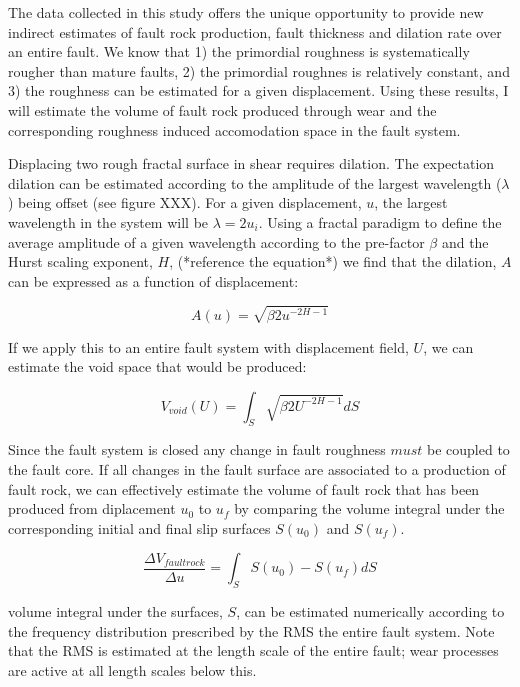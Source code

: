 \documentclass[12pt,a4paper]{article}
\begin{document}
\begin{itemize}
The data collected in this study offers the unique opportunity to provide new indirect estimates of fault rock production, fault thickness and dilation rate over an entire fault. We know that 1) the primordial roughness is systematically rougher than mature faults, 2) the primordial roughnes is relatively constant, and 3) the roughness can be estimated for a given displacement. Using these results, I will estimate the volume of fault rock produced through wear and the corresponding roughness induced accomodation space in the fault system.

Displacing two rough fractal surface in shear requires dilation. The expectation dilation can be estimated according to the amplitude of the largest wavelength ($\lambda$) being offset (see figure XXX). For a given displacement, $u$, the largest wavelength in the system will be $\lambda = 2u_i$. Using a fractal paradigm to define the average amplitude of a given wavelength according to the pre-factor $\beta$ and the Hurst scaling exponent, $H$, (*reference the equation*) we find that the dilation, $A$ can be expressed as a function of displacement:

\begin{equation}
	A(u) = \sqrt{\beta 2u^{-2H-1}}
\end{equation}

If we apply this to an entire fault system with displacement field, $U$, we can estimate the void space that would be produced:

\begin{equation}
	V_{void}(U) = \int_S \sqrt{\beta 2U^{-2H-1}}dS
\end{equation}

Since the fault system is closed any change in fault roughness $must$ be coupled to the fault core. If all changes in the fault surface are associated to a production of fault rock, we can effectively estimate the volume of fault rock that has been produced from diplacement $u_0$ to $u_f$ by comparing the volume integral under the corresponding initial and final slip surfaces $S(u_0)$ and $S(u_f)$.

\begin{equation}
	\dfrac {\Delta V_{fault rock}}{\Delta u} = \int_S S(u_0) - S(u_f) dS
\end{equation}

volume integral under the surfaces, $S$, can be estimated numerically according to the frequency distribution prescribed by the RMS the  entire fault system. Note that the RMS is estimated at the length scale of the entire fault; wear processes are active at all length scales below this.


\end{itemize}
\end{document}
